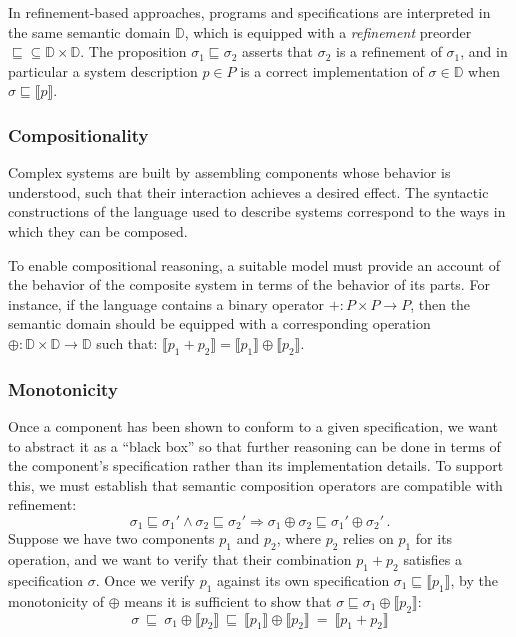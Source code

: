 \documentclass[sigplan,10pt,review,anonymous]{acmart}
\begin{document}
In refinement-based approaches,
programs and specifications are interpreted in the same
semantic domain $\mathbb{D}$,
which is equipped with a \emph{refinement} preorder
${\sqsubseteq} \subseteq \mathbb{D} \times \mathbb{D}$.
The proposition $\sigma_1 \sqsubseteq \sigma_2$
asserts that $\sigma_2$ is a refinement of $\sigma_1$,
and in particular a system description $p \in P$ is a correct implementation
of $\sigma \in \mathbb{D}$ when
$\sigma \sqsubseteq \llbracket p \rrbracket$.


\subsubsection{Compositionality} %

Complex systems are built by assembling components
whose behavior is understood,
such that their interaction achieves a desired effect.
The syntactic constructions of
the language used to describe systems
correspond to the ways in which they can be composed.

To enable compositional reasoning,
a suitable model must provide an account of
the behavior of the composite system
in terms of the behavior of its parts.
For instance,
if the language contains a binary operator
${+} : P \times P \rightarrow P$,
then the semantic domain should be equipped with
a corresponding operation
${\oplus} : \mathbb{D} \times \mathbb{D} \rightarrow \mathbb{D}$
such that:
$\llbracket p_1 + p_2 \rrbracket =
 \llbracket p_1 \rrbracket \oplus \llbracket p_2 \rrbracket$.


\subsubsection{Monotonicity} %

Once a component has been shown to conform to a given specification,
we want to abstract it as a ``black box''
so that further reasoning can be done in terms of
the component's specification rather than its implementation details.
To support this,
we must establish that semantic composition operators
are compatible with refinement:
\[ \sigma_1 \sqsubseteq \sigma_1' \wedge
   \sigma_2 \sqsubseteq \sigma_2' \Rightarrow
   \sigma_1 \oplus \sigma_2 \sqsubseteq \sigma_1' \oplus \sigma_2' \,. \]
Suppose we have two components $p_1$ and $p_2$,
where $p_2$ relies on $p_1$ for its operation,
and we want to verify that their combination $p_1 + p_2$
satisfies a specification $\sigma$.
Once we verify $p_1$ against its own specification
$\sigma_1 \sqsubseteq \llbracket p_1 \rrbracket$,
by the monotonicity of ${\oplus}$ means it is sufficient to show that
$\sigma \sqsubseteq \sigma_1 \oplus \llbracket p_2 \rrbracket$:
\[
   \sigma \:\sqsubseteq\:
   \sigma_1 \oplus \llbracket p_2 \rrbracket \:\sqsubseteq\:
   \llbracket p_1 \rrbracket \oplus \llbracket p_2 \rrbracket \:=\:
   \llbracket p_1 + p_2 \rrbracket
\]
\end{document}

